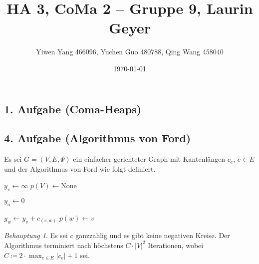 \documentclass[draft,a5paper]{article}
\author{Yiwen Yang 466096, Yuchen Guo 480788, Qing Wang 458040}
\date{\today}
\title{HA 3, CoMa 2 -- Gruppe 9, Laurin Geyer}
\theoremstyle{remark}
\newtheorem*{beh}{Behauptung}
\newcommand{\envert}[1]{\left\lvert#1\right\rvert}
\begin{document}
\maketitle

\newpage

\subsection*{1. Aufgabe (Coma-Heaps)}


\subsection*{4. Aufgabe (Algorithmus von Ford)}

Es sei \(G = (V, E, \Psi)\) ein einfacher gerichteter Graph mit
Kantenlängen \(c_{e}\), \(e \in E\) und der Algorithmus von Ford wie
folgt definiert.

\begin{algorithmic}
    \State \(y_{v} \gets \infty\)
    \State \(p(V) \gets \text{None}\)
  \EndFor

  \State \(y_{a} \gets 0\)

    \State \(y_{w} \gets y_{v} + c_{(v, w)}\)
    \State \(p(w) \gets v\)
  \EndWhile
\end{algorithmic}

\begin{beh}
  Es sei \(c\) ganzzahlig und es gibt keine negativen Kreise.  Der
  Algorithmus terminiert nach höchstens \(C \cdot \envert{V}^{2}\)
  Iterationen, wobei \(C \coloneq 2 \cdot \max_{e \in E}{\envert{c_{e}}} + 1\) sei.
\end{beh}
\end{document}
